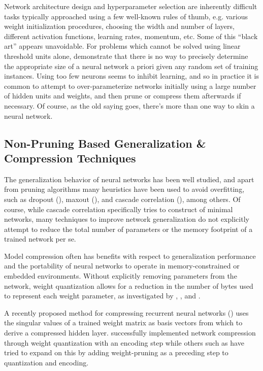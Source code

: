 Network architecture design and hyperparameter selection are inherently difficult tasks typically approached using a few well-known rules of thumb, e.g. various weight initialization procedures, choosing the width and number of layers, different activation functions, learning rates, momentum, etc. Some of this ``black art'' appears unavoidable. For problems which cannot be solved using linear threshold units alone, \cite{baum1989size} demonstrate that there is no way to precisely determine the appropriate size of a neural network a priori given any random set of training instances. Using too few neurons seems to inhibit learning, and so in practice it is common to attempt to over-parameterize networks initially using a large number of hidden units and weights, and then prune or compress them afterwards if necessary. Of course, as the old saying goes, there's more than one way to skin a neural network. 

\subsection{Non-Pruning Based Generalization \& Compression Techniques}

The generalization behavior of neural networks has been well studied, and apart from pruning algorithms many heuristics have been used to avoid overfitting, such as dropout (\cite{srivastava2014dropout}), maxout (\cite{goodfellow2013maxout}), and cascade correlation (\cite{fahlman1989cascade}), among others. Of course, while cascade correlation specifically tries to construct of minimal networks, many techniques to improve network generalization do not explicitly attempt to reduce the total number of parameters or the memory footprint of a trained network per se.  

Model compression often has benefits with respect to generalization performance and the portability of neural networks to operate in memory-constrained or embedded environments. Without explicitly removing parameters from the network, weight quantization allows for a reduction in the number of bytes used to represent each weight parameter, as investigated by \cite{balzer1991weight}, \cite{dundar1994effects}, and \cite{hoehfeld1992learning}. 

A recently proposed method for compressing recurrent neural networks (\cite{prabhavalkar2016compression}) uses the singular values of a trained weight matrix as basis vectors from which to derive a compressed hidden layer. \cite{Anders2016quant} successfully implemented network compression through weight quantization with an encoding step while others such as \cite{deepcompression2016} have tried to expand on this by adding weight-pruning as a preceding step to quantization and encoding. 

